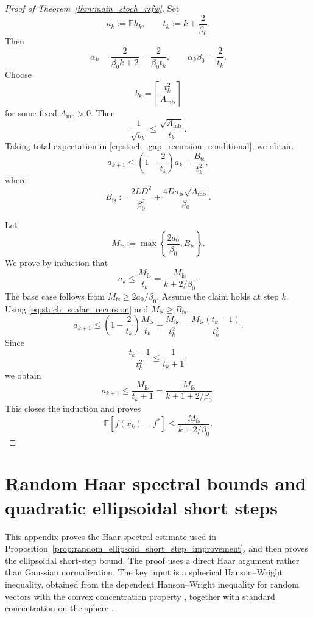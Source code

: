 \documentclass{article}
\begin{document}
\begin{proof}[Proof of Theorem~\ref{thm:main_stoch_rsfw}]
Set
\[
a_k:=\mathbb E h_k,
\qquad
t_k:=k+\frac{2}{\beta_0}.
\]
Then
\[
\alpha_k
=
\frac{2}{\beta_0 k+2}
=
\frac{2}{\beta_0 t_k},
\qquad
\alpha_k\beta_0=\frac{2}{t_k}.
\]
Choose
\[
b_k=
\left\lceil \frac{t_k^2}{A_{\mathrm{mb}}}\right\rceil
\]
for some fixed \(A_{\mathrm{mb}}>0\). Then
\[
\frac{1}{\sqrt{b_k}}
\le
\frac{\sqrt{A_{\mathrm{mb}}}}{t_k}.
\]
Taking total expectation in
\eqref{eq:stoch_gap_recursion_conditional}, we obtain
\begin{equation}
a_{k+1}
\le
\left(1-\frac{2}{t_k}\right)a_k
+
\frac{B_{\mathrm{fs}}}{t_k^2},
\label{eq:stoch_scalar_recursion}
\end{equation}
where
\begin{equation}
B_{\mathrm{fs}}
:=
\frac{2LD^2}{\beta_0^2}
+
\frac{4D\sigma_{\mathrm{fs}}\sqrt{A_{\mathrm{mb}}}}{\beta_0}.
\label{eq:Bfs_def}
\end{equation}

Let
\[
M_{\mathrm{fs}}
:=
\max\left\{
\frac{2a_0}{\beta_0},
B_{\mathrm{fs}}
\right\}.
\]
We prove by induction that
\[
a_k\le \frac{M_{\mathrm{fs}}}{t_k}
=
\frac{M_{\mathrm{fs}}}{k+2/\beta_0}.
\]
The base case follows from \(M_{\mathrm{fs}}\ge 2a_0/\beta_0\). Assume the
claim holds at step \(k\). Using
\eqref{eq:stoch_scalar_recursion} and \(M_{\mathrm{fs}}\ge B_{\mathrm{fs}}\),
\[
a_{k+1}
\le
\left(1-\frac{2}{t_k}\right)\frac{M_{\mathrm{fs}}}{t_k}
+
\frac{M_{\mathrm{fs}}}{t_k^2}
=
\frac{M_{\mathrm{fs}}(t_k-1)}{t_k^2}.
\]
Since
\[
\frac{t_k-1}{t_k^2}
\le
\frac{1}{t_k+1},
\]
we obtain
\[
a_{k+1}
\le
\frac{M_{\mathrm{fs}}}{t_k+1}
=
\frac{M_{\mathrm{fs}}}{k+1+2/\beta_0}.
\]
This closes the induction and proves
\[
\mathbb E[f(x_k)-f^*]
\le
\frac{M_{\mathrm{fs}}}{k+2/\beta_0}.
\]
\end{proof}


\section{Random Haar spectral bounds and quadratic ellipsoidal short steps}
\label{app:random_haar_quadratic}

This appendix proves the Haar spectral estimate used in
Proposition~\ref{prop:random_ellipsoid_short_step_improvement}, and then proves
the ellipsoidal short-step bound. The proof uses a direct Haar argument rather
than Gaussian normalization. The key input is a spherical Hanson--Wright
inequality, obtained from the dependent Hanson--Wright inequality for random
vectors with the convex concentration property
\cite{Adamczak2015DependentHW}, together with standard concentration on the
sphere \cite{Ledoux2001Concentration}.
\end{document}
